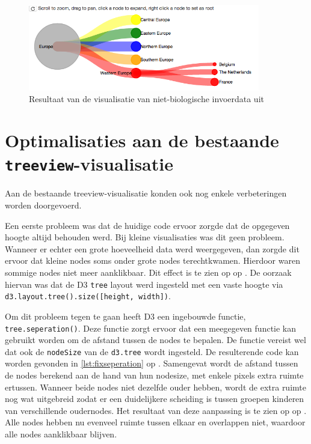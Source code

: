 \begin{figure}
    \centering
    \includegraphics[width=0.9\textwidth]{includes/visexample4}
    \caption{Resultaat van de visualisatie van niet-biologische invoerdata uit 
    }
    \label{fig:visexample4}
\end{figure}


\section[Optimalisaties aan de bestaande 
\texttt{treeview}-visualisatie]{Optimalisaties aan de bestaande 
\texttt{treeview}-visualisatie%
  }

Aan de bestaande treeview-visualisatie konden ook nog enkele verbeteringen  
worden doorgevoerd.

Een eerste probleem was dat de huidige code ervoor zorgde dat de opgegeven
hoogte altijd behouden werd. Bij kleine visualisaties was dit geen probleem.
Wanneer er echter een grote hoeveelheid data werd weergegeven, dan zorgde dit 
ervoor dat kleine nodes soms onder grote nodes terechtkwamen. Hierdoor waren 
sommige nodes niet meer aanklikbaar. Dit effect is te zien op 
op . De oorzaak hiervan was dat de D3 
\texttt{tree} layout werd ingesteld met een vaste hoogte via
\lstinline|d3.layout.tree().size([height, width])|.

Om dit probleem tegen te gaan heeft D3 een ingebouwde functie, 
\texttt{tree.seperation()}\cite{d3treeseperation:online}. Deze functie zorgt 
ervoor dat een meegegeven functie kan gebruikt worden om de afstand tussen de 
nodes te bepalen. De functie vereist wel dat ook de \texttt{nodeSize} van de 
\texttt{d3.tree} wordt ingesteld. De resulterende code kan worden gevonden in
\autoref{lst:fixseperation} op .
Samengevat wordt de afstand tussen de nodes berekend aan de hand van hun 
nodesize, met enkele pixels extra ruimte ertussen. Wanneer beide nodes niet 
dezelfde ouder hebben, wordt de extra ruimte nog wat uitgebreid zodat er een 
duidelijkere scheiding is tussen groepen kinderen van verschillende oudernodes. 
Het resultaat van deze aanpassing is te zien op  op 
. Alle nodes hebben nu evenveel ruimte 
tussen elkaar en overlappen niet, waardoor alle nodes aanklikbaar blijven.


